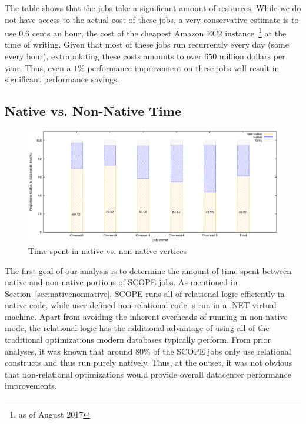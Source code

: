 The table shows that the jobs take a significant amount of resources. 
While we do not have access to the actual cost of these jobs, a very conservative estimate is to use $0.6$ cents an hour, the cost of the cheapest Amazon EC2 instance~\footnote{as of August 2017} at the time of writing. 
Given that most of these jobs run recurrently every day (some every hour), extrapolating these costs amounts to over $650$ million dollars per year. 
Thus, even a $1$\% performance improvement on these jobs will result in significant performance savings. 


\subsection{Native vs. Non-Native Time}
\begin{figure}[ht]
\includegraphics[width=2\columnwidth]{graphs/proportions2}
\caption{Time spent in native vs. non-native vertices}
\label{fig:nativeVsNonNative}
\end{figure}
The first goal of our analysis is to determine the amount of time spent between native and non-native portions of SCOPE jobs. 
As mentioned in Section~\ref{sec:nativenonnative}, SCOPE runs all of relational logic efficiently in native code, while user-defined non-relational code is run in a .NET virtual machine. 
Apart from avoiding the inherent overheads of running in non-native mode, the relational logic has the additional advantage of using all of the traditional optimizations modern databases typically perform.
From prior analyses, it was known that around $80$\% of the SCOPE jobs only use relational constructs and thus run purely natively. 
Thus, at the outset, it was not obvious that non-relational optimizations would provide overall datacenter performance improvements. 



